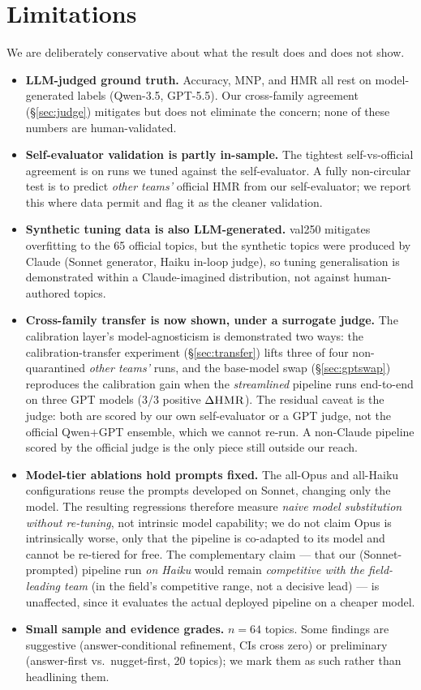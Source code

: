 \documentclass[sigconf,nonacm]{acmart}
\newcommand{\HMR}{\textsc{HMR}}
\newcommand{\MNP}{\textsc{MNP}}
\begin{document}
\section{Limitations}
\label{sec:limits}
We are deliberately conservative about what the result does and does not show.
\begin{itemize}
  \item \textbf{LLM-judged ground truth.} Accuracy, \MNP, and \HMR{} all rest on
    model-generated labels (Qwen-3.5, GPT-5.5). Our cross-family agreement (\S\ref{sec:judge})
    mitigates but does not eliminate the concern; none of these numbers are human-validated.
  \item \textbf{Self-evaluator validation is partly in-sample.} The tightest self-vs-official
    agreement is on runs we tuned against the self-evaluator. A fully non-circular test is
    to predict \emph{other teams'} official \HMR{} from our self-evaluator; we report this
    where data permit and flag it as the cleaner validation.
  \item \textbf{Synthetic tuning data is also LLM-generated.} val250 mitigates overfitting
    to the 65 official topics, but the synthetic topics were produced by Claude (Sonnet
    generator, Haiku in-loop judge), so tuning generalisation is demonstrated within a
    Claude-imagined distribution, not against human-authored topics.
  \item \textbf{Cross-family transfer is now shown, under a surrogate judge.} The calibration
    layer's model-agnosticism is demonstrated two ways: the calibration-transfer experiment
    (\S\ref{sec:transfer}) lifts three of four non-quarantined \emph{other teams'} runs, and the base-model
    swap (\S\ref{sec:gptswap}) reproduces the calibration gain when the \emph{streamlined}
    pipeline runs end-to-end on three GPT models (3/3 positive $\Delta\HMR$). The residual caveat is the judge:
    both are scored by our own self-evaluator or a GPT judge, not the official Qwen$+$GPT
    ensemble, which we cannot re-run. A non-Claude pipeline scored by the official judge is
    the only piece still outside our reach.
  \item \textbf{Model-tier ablations hold prompts fixed.} The all-Opus and all-Haiku
    configurations reuse the prompts developed on Sonnet, changing only the model. The
    resulting regressions therefore measure \emph{naive model substitution without
    re-tuning}, not intrinsic model capability; we do not claim Opus is intrinsically
    worse, only that the pipeline is co-adapted to its model and cannot be re-tiered for
    free. The complementary claim --- that our (Sonnet-prompted) pipeline run \emph{on
    Haiku} would remain \emph{competitive with the field-leading team} (in the field's competitive range, not a decisive lead) --- is unaffected, since it evaluates the actual
    deployed pipeline on a cheaper model.
  \item \textbf{Small sample and evidence grades.} $n=64$ topics. Some findings are
    suggestive (answer-conditional refinement, CIs cross zero) or preliminary
    (answer-first vs.\ nugget-first, 20 topics); we mark them as such rather than
    headlining them.
\end{itemize}
\end{document}

